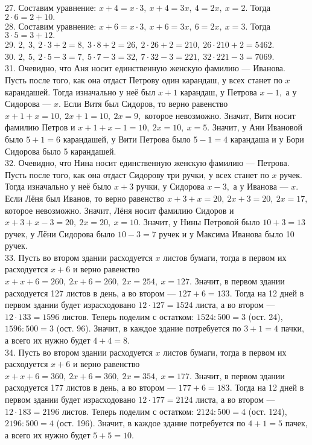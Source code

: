 27. Составим уравнение: $x+4=x\cdot3,\ x+4=3x,\ 4=2x,\ x=2.$ Тогда $2\cdot6=2+10.$\\
28. Составим уравнение: $x+6=x\cdot3,\ x+6=3x,\ 6=2x,\ x=3.$ Тогда $3\cdot5=3+12.$\\
29. $2,\ 3,\ 2\cdot3+2=8,\ 3\cdot8+2=26,\ 2\cdot26+2=210,\ 26\cdot210+2=5462.$\\
30. $2,\ 5,\ 2\cdot5-3=7,\ 5\cdot7-3=32,\ 7\cdot32-3=221,\ 32\cdot221-3=7069.$\\
31. Очевидно, что Аня носит единственную женскую фамилию --- Иванова. Пусть после того, как она отдаст Петрову один карандаш, у всех станет по $x$ карандашей. Тогда изначально у неё был $x+1$ карандаш, у Петрова $x-1,$ а у Сидорова --- $x.$ Если Витя был Сидоров, то верно равенство $x+1+x=10,\ 2x+1=10,\ 2x=9,$ которое невозможно. Значит, Витя носит фамилию Петров и $x+1+x-1=10,\ 2x=10,\ x=5.$ Значит, у Ани Ивановой было $5+1=6$ карандашей, у Вити Петрова было $5-1=4$ карандаша и у Бори Сидорова было 5 карандашей.\\
32. Очевидно, что Нина носит единственную женскую фамилию --- Петрова. Пусть после того, как она отдаст Сидорову три ручки, у всех станет по $x$ ручек. Тогда изначально у неё было $x+3$ ручки, у Сидорова $x-3,$ а у Иванова --- $x.$ Если Лёня был Иванов, то верно равенство $x+3+x=20,\ 2x+3=20,\ 2x=17,$ которое невозможно. Значит, Лёня носит фамилию Сидоров и $x+3+x-3=20,\ 2x=20,\ x=10.$ Значит, у Нины Петровой было $10+3=13$ ручек, у Лёни Сидорова было $10-3=7$ ручек и у Максима Иванова было 10 ручек.\\
33. Пусть во втором здании расходуется $x$ листов бумаги, тогда в первом их расходуется $x+6$ и верно равенство $x+x+6=260,\ 2x+6=260,\ 2x=254,\ x=127.$ Значит, в первом здании расходуется 127 листов в день, а во втором --- $127+6=133.$ Тогда на 12 дней в первом здании будет израсходовано $12\cdot127=1524$ листа, а во втором --- $12\cdot133=1596$ листов. Теперь поделим с остатком: $1524:500=3$ (ост. 24), $1596:500=3$ (ост. 96). Значит, в каждое здание потребуется по $3+1=4$ пачки, а всего их нужно будет $4+4=8.$\\
34. Пусть во втором здании расходуется $x$ листов бумаги, тогда в первом их расходуется $x+6$ и верно равенство $x+x+6=360,\ 2x+6=360,\ 2x=354,\ x=177.$ Значит, в первом здании расходуется 177 листов в день, а во втором --- $177+6=183.$ Тогда на 12 дней в первом здании будет израсходовано $12\cdot177=2124$ листа, а во втором --- $12\cdot183=2196$ листов. Теперь поделим с остатком: $2124:500=4$ (ост. 124), $2196:500=4$ (ост. 196). Значит, в каждое здание потребуется по $4+1=5$ пачек, а всего их нужно будет $5+5=10.$\\
